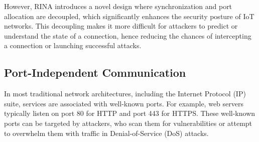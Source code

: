 \documentclass{ieeeaccess}
\begin{document}
However, RINA introduces a novel design where synchronization and port allocation are decoupled, which significantly enhances the security posture of IoT networks. This decoupling makes it more difficult for attackers to predict or understand the state of a connection, hence reducing the chances of intercepting a connection or launching successful attacks.


%

\subsection{Port-Independent Communication}
In most traditional network architectures, including the Internet Protocol (IP) suite, services are associated with well-known ports. For example, web servers typically listen on port 80 for HTTP and port 443 for HTTPS. These well-known ports can be targeted by attackers, who scan them for vulnerabilities or attempt to overwhelm them with traffic in Denial-of-Service (DoS) attacks.
\end{document}
